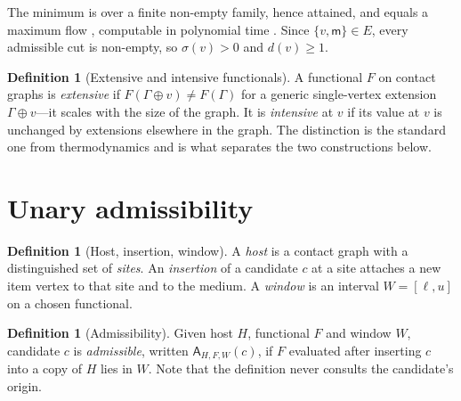 \documentclass[11pt,twocolumn,a4paper]{article}
\theoremstyle{upthm}
\theoremstyle{definition}
\newtheorem{definition}[theorem]{Definition}
\theoremstyle{remark}
\newcommand{\Gph}{\Gamma}
\newcommand{\E}{E}
\newcommand{\med}{\mathsf{m}}
\newcommand{\sep}{\sigma}
\newcommand{\dep}{d}
\newcommand{\adm}{\mathsf{A}}
\begin{document}
The minimum is over a finite non-empty family, hence attained, and equals
a maximum flow \citep{fordfulkerson1956}, computable in polynomial time
\citep{stoer1997,orlin2013}. Since $\{v,\med\}\in\E$, every admissible
cut is non-empty, so $\sep(v)>0$ and $\dep(v)\ge1$.

\begin{definition}[Extensive and intensive functionals]
\label{def:ext-int}
A functional $F$ on contact graphs is \emph{extensive} if
$F(\Gph\oplus v)\ne F(\Gph)$ for a generic single-vertex extension
$\Gph\oplus v$---it scales with the size of the graph. It is
\emph{intensive} at $v$ if its value at $v$ is unchanged by extensions
elsewhere in the graph. The distinction is the standard one from
thermodynamics \citep{callen1985,redlich1970} and is what separates the
two constructions below.
\end{definition}

\section{Unary admissibility}
\label{sec:unary}

\begin{definition}[Host, insertion, window]
\label{def:host}
A \emph{host} is a contact graph with a distinguished set of
\emph{sites}. An \emph{insertion} of a candidate $c$ at a site attaches a
new item vertex to that site and to the medium. A \emph{window} is an
interval $W=[\ell,u]$ on a chosen functional.
\end{definition}

\begin{definition}[Admissibility]
\label{def:adm}
Given host $H$, functional $F$ and window $W$, candidate $c$ is
\emph{admissible}, written $\adm_{H,F,W}(c)$, if $F$ evaluated after
inserting $c$ into a copy of $H$ lies in $W$. Note that the definition
never consults the candidate's origin.
\end{definition}
\end{document}
